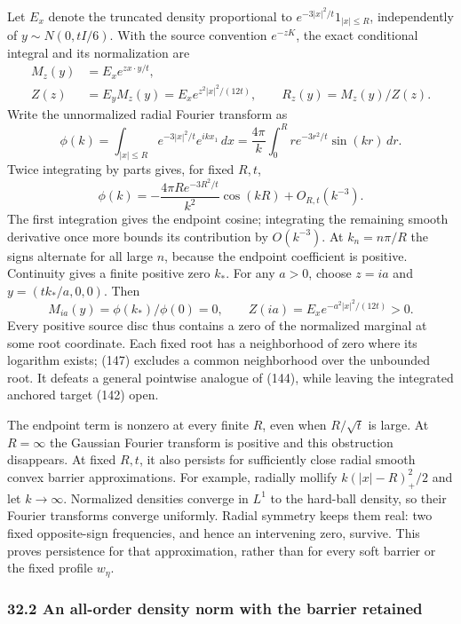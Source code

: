 \documentclass[11pt,a4paper]{article}
\begin{document}
Let \(E_x\) denote the truncated density proportional to
\(e^{-3|x|^2/t}1_{|x|\le R}\), independently of \(y\sim N(0,tI/6)\).
With the source convention \(e^{-zK}\), the exact conditional integral
and its normalization are \[\begin{aligned}
M_z(y)&=E_xe^{z x\cdot y/t},\\
Z(z)&=E_yM_z(y)=E_xe^{z^2|x|^2/(12t)},\qquad
R_z(y)=M_z(y)/Z(z).
\end{aligned}\tag{146}\] Write the unnormalized radial Fourier transform
as \[\phi(k)=\int_{|x|\le R}e^{-3|x|^2/t}e^{ikx_1}\,dx
=\frac{4\pi}k\int_0^Rr e^{-3r^2/t}\sin(kr)\,dr.\] Twice integrating by
parts gives, for fixed \(R,t\),
\[\phi(k)=-\frac{4\pi R e^{-3R^2/t}}{k^2}\cos(kR)
                      +O_{R,t}(k^{-3}).\] The first integration gives
the endpoint cosine; integrating the remaining smooth derivative once
more bounds its contribution by \(O(k^{-3})\). At \(k_n=n\pi/R\) the
signs alternate for all large \(n\), because the endpoint coefficient is
positive. Continuity gives a finite positive zero \(k_*\). For any
\(a>0\), choose \(z=ia\) and \(y=(tk_*/a,0,0)\). Then
\[M_{ia}(y)=\phi(k_*)/\phi(0)=0,\qquad
Z(ia)=E_xe^{-a^2|x|^2/(12t)}>0.\tag{147}\] Every positive source disc
thus contains a zero of the normalized marginal at some root coordinate.
Each fixed root has a neighborhood of zero where its logarithm exists;
(147) excludes a common neighborhood over the unbounded root. It defeats
a general pointwise analogue of (144), while leaving the integrated
anchored target (142) open.

The endpoint term is nonzero at every finite \(R\), even when
\(R/\sqrt t\) is large. At \(R=\infty\) the Gaussian Fourier transform
is positive and this obstruction disappears. At fixed \(R,t\), it also
persists for sufficiently close radial smooth convex barrier
approximations. For example, radially mollify \(k(|x|-R)_+^2/2\) and let
\(k\to\infty\). Normalized densities converge in \(L^1\) to the
hard-ball density, so their Fourier transforms converge uniformly.
Radial symmetry keeps them real: two fixed opposite-sign frequencies,
and hence an intervening zero, survive. This proves persistence for that
approximation, rather than for every soft barrier or the fixed profile
\(w_\eta\).

\hypertarget{an-all-order-density-norm-with-the-barrier-retained}{%
\subsubsection{32.2 An all-order density norm with the barrier
retained}\label{an-all-order-density-norm-with-the-barrier-retained}}
\end{document}
